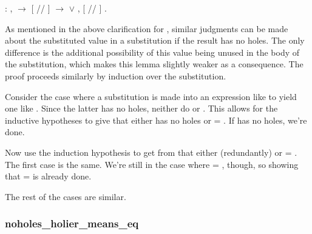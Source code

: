 \documentclass[12pt]{report}
\begin{document}
\begin{coqdoccode}
\coqdocemptyline
\coqdocindent{1.00em}
  : \coqdockw{\ensuremath{\forall}}    ,\coqdoceol
\coqdocindent{1.00em}
  \ensuremath{\rightarrow}\coqdoceol
\coqdocindent{1.00em}
[ // ]    \ensuremath{\rightarrow}\coqdoceol
\coqdocindent{1.00em}
  \ensuremath{\lor} \coqdockw{\ensuremath{\forall}} , [ // ]   .\coqdoceol
\coqdocemptyline
\end{coqdoccode}
As mentioned in the above clarification for ,
similar judgments can be made about the substituted value in
a substitution if the result has no holes. The only difference is the
additional possibility of this value being unused in the body of the
substitution, which makes this lemma slightly weaker as
a consequence. The proof proceeds similarly by induction over the
substitution. 

 Consider the case where a substitution is made into an expression
like    to yield one like   . Since the
latter has no holes, neither do  or . This allows for
the inductive hypotheses to give that either  has no holes or
 = . If  has no holes, we're done.


Now use the induction hypothesis to get from   that
either (redundantly)   or  = . The first case is
the same. We're still in the case where  = , though, so
showing that    =    is already done.


The rest of the cases are similar. 

\subsubsection{noholes\_holier\_means\_eq}
\end{document}
